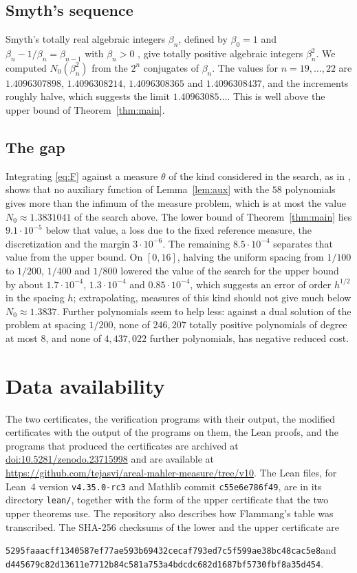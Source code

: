 \documentclass[11pt]{amsart}
\theoremstyle{remark}
\numberwithin{equation}{section}
\newcommand{\MarginLo}{3\cdot10^{-6}}
\newcommand{\PrimalVal}{1.3831041}
\newcommand{\SmySeq}{1.40963085}
\newcommand{\LEANVERSION}{v4.35.0-rc3}
\newcommand{\MATHLIBCOMMIT}{c55e6e786f49}
\newcommand{\SuppDOI}{10.5281/zenodo.23715998}
\newcommand{\RepoLink}{\url{https://github.com/tejasvi/areal-mahler-measure/tree/v10}}
\newcommand{\CertShaLo}{5295faaacff1340587ef77ae593b69432cecaf793ed7c5f599ae38bc48cac5e8}
\newcommand{\CertShaUp}{d445679c82d13611e7712b84c581a753a4bdcdc682d1687bf5730fbf8a35d454}
\begin{document}
\subsection*{Smyth's sequence}
Smyth's totally real algebraic integers $\beta_n$, defined by $\beta_0=1$ and $\beta_n-1/\beta_n=\beta_{n-1}$ with $\beta_n>0$ \cite{Smy80}, give totally positive algebraic integers $\beta_n^2$. We computed $N_0(\beta_n^2)$ from the $2^n$ conjugates of $\beta_n$. The values for $n=19,\dots,22$ are $1.4096307898$, $1.4096308214$, $1.4096308365$ and $1.4096308437$, and the increments roughly halve, which suggests the limit $\SmySeq\ldots$. This is well above the upper bound of Theorem~\ref{thm:main}.

\subsection*{The gap}
Integrating \eqref{eq:F} against a measure $\theta$ of the kind considered in the search, as in \cite[Section~4.1]{Tom26a}, shows that no auxiliary function of Lemma~\ref{lem:aux} with the $58$ polynomials gives more than the infimum of the measure problem, which is at most the value $N_0\approx\PrimalVal$ of the search above. The lower bound of Theorem~\ref{thm:main} lies $9.1\cdot10^{-5}$ below that value, a loss due to the fixed reference measure, the discretization and the margin $\MarginLo$. The remaining $8.5\cdot10^{-4}$ separates that value from the upper bound. On $[0,16]$, halving the uniform spacing from $1/100$ to $1/200$, $1/400$ and $1/800$ lowered the value of the search for the upper bound by about $1.7\cdot10^{-4}$, $1.3\cdot10^{-4}$ and $0.85\cdot10^{-4}$, which suggests an error of order $h^{1/2}$ in the spacing $h$; extrapolating, measures of this kind should not give much below $N_0\approx1.3837$. Further polynomials seem to help less: against a dual solution of the problem at spacing $1/200$, none of $246{,}207$ totally positive polynomials of degree at most $8$, and none of $4{,}437{,}022$ further polynomials, has negative reduced cost.

\section*{Data availability}
The two certificates, the verification programs with their output, the modified certificates with the output of the programs on them, the Lean proofs, and the programs that produced the certificates are archived at \href{https://doi.org/\SuppDOI}{doi:\SuppDOI} and are available at \RepoLink. The Lean files, for Lean~4 version \texttt{\LEANVERSION} and Mathlib commit \texttt{\MATHLIBCOMMIT}, are in its directory \texttt{lean/}, together with the form of the upper certificate that the two upper theorems use. The repository also describes how Flammang's table was transcribed. The SHA-256 checksums of the lower and the upper certificate are
\begin{center}\small\texttt{\CertShaLo}\quad and\\ \texttt{\CertShaUp}.\end{center}
\end{document}
